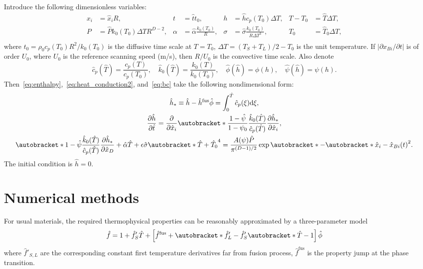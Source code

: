 \documentclass{article}
\newcommand{\dd}{\mathrm{d}}
\newcommand{\pder}[2][]{\frac{\partial#1}{\partial#2}}
\newcommand{\Pder}[2][]{\partial#1/\partial#2}
\DeclarePairedDelimiter\autobracket()       %
\newcommand{\br}[1]{\autobracket*{#1}}
\newcommand{\fusion}[1]{{#1}^\mathrm{fus}}
\begin{document}
Introduce the following dimensionless variables:
\begin{equation}\label{eq:dimensionless}
    \begin{aligned}
        x_i &= \hat{x}_iR, & t &= \hat{t}t_0, & h &= \hat{h}c_p(T_0)\Delta{T}, & T - T_0 &= \hat{T}\Delta{T}, \\
        P &= \hat{P} k_0(T_0)\Delta{T}R^{D-2}, & \alpha &= \hat{\alpha}\frac{k_0(T_0)}R, &
            \sigma &= \hat{\sigma}\frac{k_0(T_0)}{R\Delta{T}^3}, & T_0 &= \hat{T}_0\Delta{T}, \\
    \end{aligned}
\end{equation}
where \(t_0 = \rho_0 c_p(T_0) R^2/k_0(T_0)\) is the diffusive time scale at \(T=T_0\),
\(\Delta{T} = (T_S+T_L)/2 - T_0\) is the unit temperature.
If \(|\Pder[x_{Bi}]{t}|\) is of order \(U_0\), where \(U_0\) is the reference scanning speed (\si{m/s}),
then \(R/U_0\) is the convective time scale. Also denote
\begin{equation}\label{eq:dimensionless2}
    \hat{c}_p(\hat{T}) = \frac{c_p(T)}{c_p(T_0)}, \quad
    \hat{k}_0(\hat{T}) = \frac{k_0(T)}{k_0(T_0)}, \quad
    \hat{\phi}(\hat{h}) = \phi(h), \quad
    \hat{\psi}(\hat{h}) = \psi(h).
\end{equation}
Then~\eqref{eq:enthalpy},~\eqref{eq:heat_conduction2}, and~\eqref{eq:bc} take the following nondimensional form:
\begin{gather}
	\hat{h}_* \equiv \hat{h} - \fusion{\hat{h}}\hat{\phi} = \int_0^{\hat{T}} \hat{c}_p(\xi)\dd\xi, \label{eq:enthalpy_hats} \\
	\pder[\hat{h}]{\hat{t}} = \pder{\hat{x}_i}\br{
	    \frac{1-\hat{\psi}}{1-\psi_0}
	    \frac{\hat{k}_0(\hat{T})}{\hat{c}_p(\hat{T})}\pder[\hat{h}_*]{\hat{x}_i}
	}, \label{eq:heat_conduction_hats} \\
	\br{1 - \hat{\psi}} \frac{\hat{k}_0(\hat{T})}{\hat{c}_p(\hat{T})}\pder[\hat{h}_*]{\hat{x}_D} +
	    \hat{\alpha}\hat{T} + \epsilon\hat{\sigma} \br{ \hat{T} + \hat{T}_0 }^4 =
	    \frac{A(\psi)\hat{P}}{\pi^{(D-1)/2}}\exp\br{ -\br{ \hat{x}_i-\hat{x}_{Bi}(t) }^2 }. \label{eq:bc_hats}
\end{gather}
The initial condition is \(\hat{h} = 0\).

\section{Numerical methods}

For usual materials, the required thermophysical properties can be reasonably approximated by a three-parameter model
\begin{equation}\label{eq:thermophysical_model}
	\hat{f} = 1 + \hat{f}'_S\hat{T} + \left[
	    \fusion{\hat{f}} + \br{ \hat{f}'_L - \hat{f}'_S }\br{ \hat{T}-1 }
	\right]\hat{\phi}
\end{equation}
where \(\hat{f}'_{S,L}\) are the corresponding constant first temperature derivatives far from fusion process,
\(\fusion{\hat{f}}\) is the property jump at the phase transition.
\end{document}
